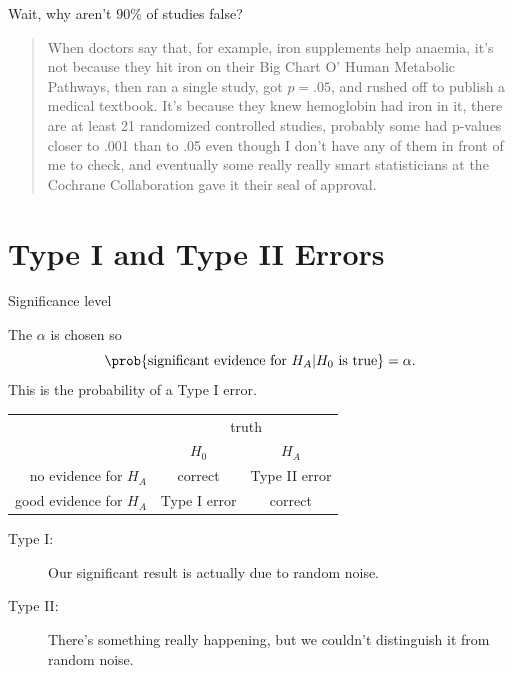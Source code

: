 \begin{frame}{Wait, why aren't 90\% of studies false?}
        \begin{quote}
    When doctors say that, for example, iron supplements help anaemia, it's not because they hit iron on their Big Chart O' Human Metabolic Pathways, then ran a single study, got $p = .05$, and rushed off to publish a medical textbook. It's because they knew hemoglobin had iron in it, there are at least 21 randomized controlled studies, probably some had p-values closer to .001 than to .05 even though I don't have any of them in front of me to check, and eventually some really really smart statisticians at the Cochrane Collaboration gave it their seal of approval. 
    \end{quote}

\end{frame}
\section{Type I and Type II Errors}


\begin{frame}{Significance level}

    The  $\alpha$ is chosen so
    \[
        \prob \{ \text{significant evidence for $H_A$} | \text{$H_0$ is true} \} = \alpha .
    \]
    This is the probability of a \alert{Type I error}.


    \vspace{2em}

    \begin{tabular}{r|cc}
        & \multicolumn{2}{c}{truth} \\
        & $H_0$ & $H_A$ \\
        \hline
        no evidence for $H_A$ & correct & Type II error \\
        good evidence for $H_A$ & Type I error & correct \\
    \end{tabular}

    \vspace{2em}

    \begin{description}
        \item[Type I:] Our significant result is actually due to random noise.
        \item[Type II:] There's something really happening, but we couldn't distinguish it from random noise.
    \end{description}

\end{frame}

